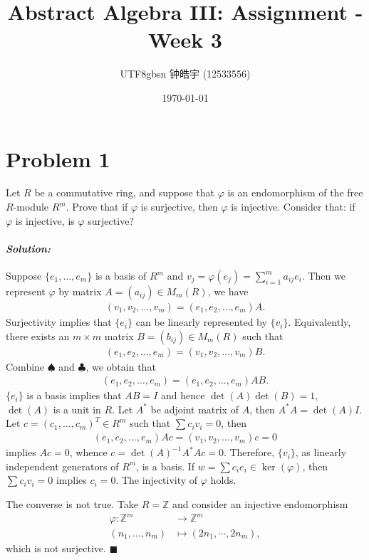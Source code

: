 \documentclass[12pt, a4paper]{article}
\title{Abstract Algebra III: Assignment - Week 3}
\author{
    \begin{CJK*}{UTF8}{gbsn}
    钟皓宇 (12533556)
    \end{CJK*}
}
\date{\today}
\newenvironment{solution}
  {\paragraph{\textit{Solution:}}\par\medskip}
  {\hfill$\blacksquare$\vspace{0.1cm}}
\begin{document}
\maketitle

\section*{Problem 1}
Let $R$ be a commutative ring, and suppose that $\varphi$ is an endomorphism of the free $R$-module $R^m$. Prove that if $\varphi$ is surjective, then $\varphi$ is injective. Consider that: if $\varphi$ is injective, is $\varphi$ surjective?
\begin{solution}
Suppose $\{e_1,\dots,e_m\}$ is a basis of $R^m$ and $v_j=\varphi(e_j) = \sum_{i=1}^m a_{ij} e_i$. Then
we represent $\varphi$ by matrix $A = (a_{ij}) \in M_m(R)$, we have 
\begin{align*}
(v_1,v_2,\dots,v_m) = (e_1,e_2,\dots,e_m) A. \tag{$\clubsuit$}
\end{align*}
Surjectivity implies that $\{e_i\}$ can be linearly represented by $\{v_i\}$. Equivalently, there exists an $m\times m$ matrix $B=(b_{ij})\in M_m(R)$ such that
\begin{align*}
    (e_1,e_2,\dots,e_m) = (v_1,v_2,\dots,v_m)B. \tag{$\spadesuit$}
\end{align*} 
Combine $\spadesuit$ and $\clubsuit$, we obtain that 
\begin{align*}
     (e_1,e_2,\dots,e_m)= (e_1,e_2,\dots,e_m)AB.
\end{align*}
$\{e_i\}$ is a basis implies that $AB=I$ and hence $\det(A)\det(B)=1$, $\det(A)$ is a unit in $R$. Let $A^*$ be adjoint matrix of $A$, then $A^*A=\det(A)I$. 
Let $c=(c_1,\dots,c_m)^T\in R^m$ such that $\sum c_iv_i=0$, then 
\begin{align*}
    (e_1,e_2,\dots,e_m) Ac = (v_1,v_2,\dots,v_m)c =0
\end{align*}  
implies $Ac=0$, whence $c=\det(A)^{-1}A^*Ac=0$. Therefore, $\{v_i\}$, as linearly independent generators of $R^m$, is a basis.  If $w=\sum c_ie_i\in\ker(\varphi)$, then 
$\sum c_iv_i=0$ implies $c_i=0$. The injectivity of $\varphi$ holds.

The converse is not true. Take $R=\mathbb{Z}$ and consider an injective endomorphism
\begin{align*}
    \varphi:\mathbb{Z}^m &\to \mathbb{Z}^m\\
    (n_1,\dots,n_m) &\mapsto (2n_1,\cdots,2n_m),
\end{align*}
which is not surjective.
\end{solution}
\end{document}
